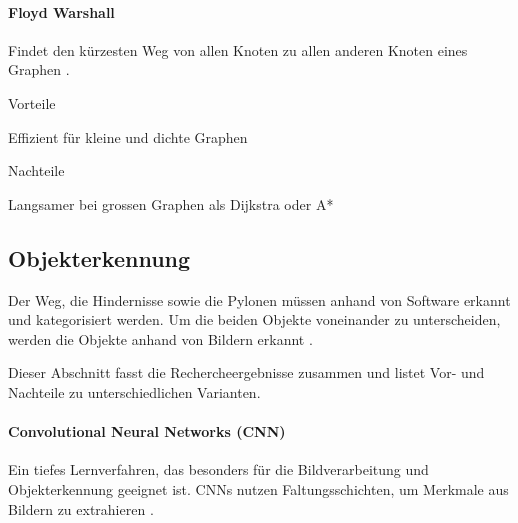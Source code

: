 \documentclass[../main.tex]{subfiles}
\begin{document}
\paragraph{Floyd Warshall}
Findet den kürzesten Weg von allen Knoten zu allen anderen Knoten eines Graphen \cite{floyd_warshall}.

\begin{minipage}[t]{0.48\textwidth}
\begin{items}
  \item [Vorteile]
  \item Effizient für kleine und dichte Graphen
\end{items}
\end{minipage}
\hfill
\begin{minipage}[t]{0.48\textwidth}
\begin{items}
  \item [Nachteile]
  \item Langsamer bei grossen Graphen als Dijkstra oder A* 
\end{items}
\end{minipage}

\subsection{Objekterkennung}

Der Weg, die Hindernisse sowie die Pylonen müssen anhand von Software erkannt und kategorisiert werden. Um die beiden Objekte voneinander zu unterscheiden, werden die Objekte anhand von Bildern erkannt \cite{object_detection_ibm}.

Dieser Abschnitt fasst die Rechercheergebnisse zusammen und listet Vor- und Nachteile zu unterschiedlichen Varianten.

\paragraph{Convolutional Neural Networks (CNN)}

Ein tiefes Lernverfahren, das besonders für die Bildverarbeitung und Objekterkennung geeignet ist. CNNs nutzen Faltungsschichten, um Merkmale aus Bildern zu extrahieren \cite{cnn}.
\end{document}
